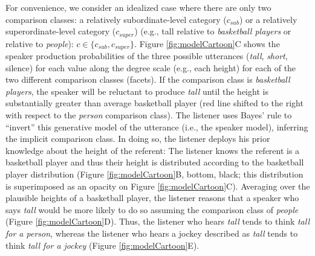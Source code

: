 \documentclass[doc, floatsintext]{apa6}
\begin{document}

For convenience, we consider an idealized case where there are only two comparison classes: a relatively subordinate-level category ($c_{sub}$) or a relatively superordinate-level category ($c_{super}$) (e.g., tall relative to \emph{basketball players} or relative to \emph{people}): \(c \in \{c_{sub}, c_{super}\}\).
Figure \ref{fig:modelCartoon}C shows the speaker production probabilities of the three possible utterances (\emph{tall}, \emph{short}, silence) for each value along the degree scale (e.g., each height) for each of the two different comparison classes (facets).
If the comparison class is \emph{basketball players}, the speaker will be reluctant to produce \emph{tall} until the height is substantially greater than average basketball player (red line shifted to the right with respect to the \emph{person} comparison class).
The listener uses Bayes' rule to ``invert'' this generative model of the utterance (i.e., the speaker model), inferring the implicit comparison class.
In doing so, the listener deploys his prior knowledge about the height of the referent: The listener knows the referent is a basketball player and thus their height is distributed according to the basketball player distribution (Figure \ref{fig:modelCartoon}B, bottom, black; this distribution is superimposed as an opacity on Figure \ref{fig:modelCartoon}C).
Averaging over the plausible heights of a basketball player, the listener reasons that a speaker who says \emph{tall} would be more likely to do so assuming the comparison class of \emph{people}  (Figure \ref{fig:modelCartoon}D).
Thus, the listener who hears \emph{tall} tends to think \emph{tall for a person}, whereas the listener who hears a jockey described as \emph{tall} tends to think \emph{tall for a jockey} (Figure \ref{fig:modelCartoon}E).
\end{document}
